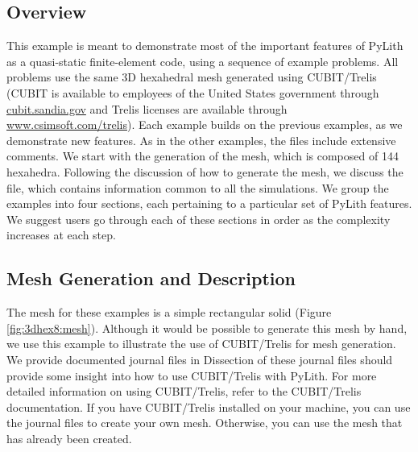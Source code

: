 \subsection{Overview}

This example is meant to demonstrate most of the important features of
PyLith as a quasi-static finite-element code, using a sequence of
example problems. All problems use the same 3D hexahedral mesh
generated using CUBIT/Trelis (CUBIT is available to employees of the
United States government through \url{cubit.sandia.gov} and Trelis
licenses are available through \url{www.csimsoft.com/trelis}). Each
example builds on the previous examples, as we demonstrate new
features. As in the other examples, the files include extensive
comments. We start with the generation of the mesh, which is composed
of 144 hexahedra. Following the
discussion of how to generate the mesh, we discuss the
 file, which contains information common to
all the simulations. We group the examples into four sections, each
pertaining to a particular set of PyLith features. We suggest users go
through each of these sections in order as the complexity increases at
each step.


\subsection{Mesh Generation and Description}

The mesh for these examples is a simple rectangular solid (Figure
\vref{fig:3dhex8:mesh}). Although it would be possible to generate
this mesh by hand, we use this example to illustrate the use of
CUBIT/Trelis for mesh generation. We provide documented journal files
in  Dissection of these journal files
should provide some insight into how to use CUBIT/Trelis with
PyLith. For more detailed information on using CUBIT/Trelis, refer to
the CUBIT/Trelis documentation. If you have CUBIT/Trelis installed on
your machine, you can use the journal files to create your own
mesh. Otherwise, you can use the mesh that has already been created.

